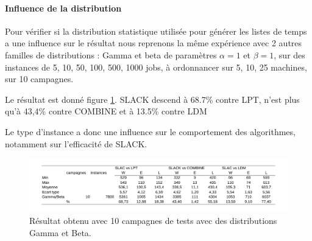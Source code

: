 \documentclass[a4paper,12pt]{report}
\theoremstyle{plain}				%
\theoremstyle{definition}				%
\begin{document}
\bigskip
\paragraph{Influence de la distribution}
Pour vérifier si la distribution statistique utilisée pour générer les listes de temps 
  a une influence sur le résultat 
  nous reprenons la même expérience avec 2 autres familles de distributions : 
  Gamma et beta de paramètres $\alpha = 1$ et $\beta = 1$,
  sur des instances de 5, 10, 50, 100, 500, 1000 jobs, 
  à ordonnancer sur 5, 10, 25 machines,
  sur 10 campagnes.

Le résultat est donné figure \ref{fig:resultatReproduction10GammaBeta}.
SLACK descend à 68.7\% contre LPT, 
n'est plus qu'à 43,4\% contre COMBINE et
à 13.5\% contre LDM

\bigskip
Le type d'instance a donc une influence sur le comportement des algorithmes, notamment sur l'efficacité de SLACK.
   
\begin{figure}
{\centering
\includegraphics[width=\columnwidth]{5_Resultat_Reproduction10GammaBeta.pdf}
\caption{Résultat obtenu avec 10 campagnes de tests avec des distributions Gamma et Beta.}
\label{fig:resultatReproduction10GammaBeta}
\par}
\end{figure}

\bigskip
\end{document}
